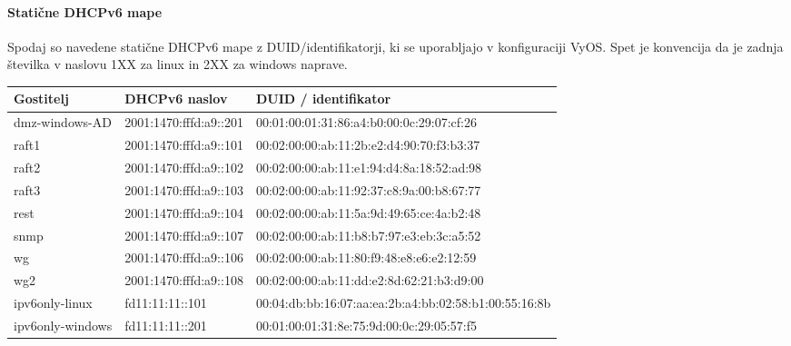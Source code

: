 \documentclass[a4paper,11pt]{article}
\begin{document}
\paragraph{Statične DHCPv6 mape}
Spodaj so navedene statične DHCPv6 mape z DUID/identifikatorji, ki se uporabljajo v konfiguraciji VyOS.
Spet je konvencija da je zadnja številka v naslovu 1XX za linux in 2XX za windows naprave.
\begin{longtable}{|l|l|l|}
\hline
\textbf{Gostitelj} & \textbf{DHCPv6 naslov} & \textbf{DUID / identifikator} \\
\hline
dmz-windows-AD & 2001:1470:fffd:a9::201 & 00:01:00:01:31:86:a4:b0:00:0c:29:07:cf:26 \\
\hline
raft1 & 2001:1470:fffd:a9::101 & 00:02:00:00:ab:11:2b:e2:d4:90:70:f3:b3:37 \\
\hline
raft2 & 2001:1470:fffd:a9::102 & 00:02:00:00:ab:11:e1:94:d4:8a:18:52:ad:98 \\
\hline
raft3 & 2001:1470:fffd:a9::103 & 00:02:00:00:ab:11:92:37:c8:9a:00:b8:67:77 \\
\hline
rest & 2001:1470:fffd:a9::104 & 00:02:00:00:ab:11:5a:9d:49:65:ce:4a:b2:48 \\
\hline
snmp & 2001:1470:fffd:a9::107 & 00:02:00:00:ab:11:b8:b7:97:e3:eb:3c:a5:52 \\
\hline
wg & 2001:1470:fffd:a9::106 & 00:02:00:00:ab:11:80:f9:48:e8:e6:e2:12:59 \\
\hline
wg2 & 2001:1470:fffd:a9::108 & 00:02:00:00:ab:11:dd:e2:8d:62:21:b3:d9:00 \\
\hline
ipv6only-linux & fd11:11:11::101 & 00:04:db:bb:16:07:aa:ea:2b:a4:bb:02:58:b1:00:55:16:8b \\
\hline
ipv6only-windows & fd11:11:11::201 & 00:01:00:01:31:8e:75:9d:00:0c:29:05:57:f5 \\
\hline
\end{longtable}
\end{document}
